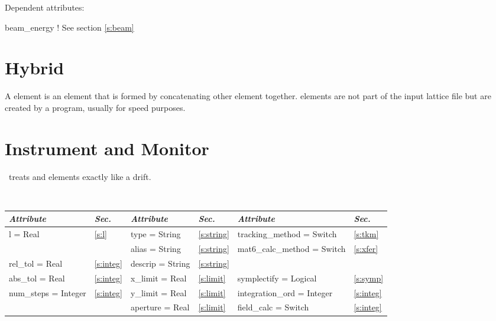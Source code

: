 \vskip0.05in \noindent
Dependent attributes:
\begin{example}
  beam\_energy  ! See section \ref{s:beam}
\end{example}

\section{Hybrid}
\label{s:hybrid}

A  element is an element that is formed by concatenating
other element together.  elements are not part of the input
lattice file but are created by a program, usually for speed purposes.

\section{Instrument and Monitor}
\label{s:monitor}

\bmad\ treats  and  elements exactly like
a drift.

\toffset
\begin{center}
\tt
\begin{tabular}{|l|l||l|l||l|l|} \hline
  {\sl Attribute} & {\sl Sec.}  & {\sl Attribute} & {\sl Sec.} & {\sl Attribute} & {\sl Sec.} \\ \hline
  l        = Real       & \ref{s:l}     & type = String      & \ref{s:string} & tracking\_method = Switch    & \ref{s:tkm}   \\ \hline
                        &               & alias = String     & \ref{s:string} & mat6\_calc\_method = Switch  & \ref{s:xfer}  \\ \hline
  rel\_tol = Real       & \ref{s:integ} & descrip = String   & \ref{s:string} &                              &               \\ \hline
  abs\_tol = Real       & \ref{s:integ} & x\_limit = Real    & \ref{s:limit}  & symplectify = Logical        & \ref{s:symp}  \\ \hline
  num\_steps = Integer  & \ref{s:integ} & y\_limit = Real    & \ref{s:limit}  & integration\_ord = Integer   & \ref{s:integ} \\ \hline
                        &               & aperture = Real    & \ref{s:limit}  & field\_calc = Switch         & \ref{s:integ} \\ \hline
\end{tabular}
\end{center}
\toffset

